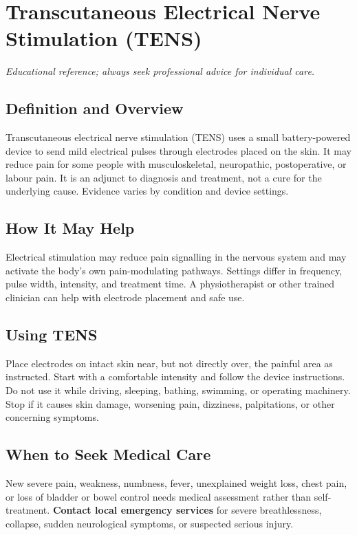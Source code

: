 \chapter{Transcutaneous Electrical Nerve Stimulation (TENS)}
\medskip
\noindent\textit{Educational reference; always seek professional advice for individual care.}

\section*{Definition and Overview}
Transcutaneous electrical nerve stimulation (TENS) uses a small battery-powered device to send mild electrical pulses through electrodes placed on the skin. It may reduce pain for some people with musculoskeletal, neuropathic, postoperative, or labour pain. It is an adjunct to diagnosis and treatment, not a cure for the underlying cause. Evidence varies by condition and device settings.

\section*{How It May Help}
Electrical stimulation may reduce pain signalling in the nervous system and may activate the body's own pain-modulating pathways. Settings differ in frequency, pulse width, intensity, and treatment time. A physiotherapist or other trained clinician can help with electrode placement and safe use.

\section*{Using TENS}
Place electrodes on intact skin near, but not directly over, the painful area as instructed. Start with a comfortable intensity and follow the device instructions. Do not use it while driving, sleeping, bathing, swimming, or operating machinery. Stop if it causes skin damage, worsening pain, dizziness, palpitations, or other concerning symptoms.

\section*{When to Seek Medical Care}
New severe pain, weakness, numbness, fever, unexplained weight loss, chest pain, or loss of bladder or bowel control needs medical assessment rather than self-treatment. \textbf{Contact local emergency services} for severe breathlessness, collapse, sudden neurological symptoms, or suspected serious injury.

